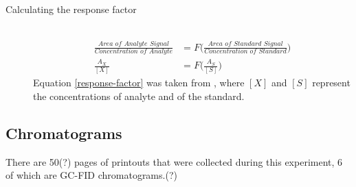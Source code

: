\documentclass[a4paper, 12pt]{article}
\begin{document}
\begin{description}
	\item[Calculating the response factor] \hfill \\
		\begin{equation} \label{response-factor}
		\begin{split}
			\frac{\textit{Area of Analyte Signal}}{\textit{Concentration of Analyte}} & = F\Bigg(\frac{\textit{Area of Standard Signal}}{\textit{Concentration of Standard}}\Bigg) \\
			\frac{A_X}{[X]} & = F\Bigg(\frac{A_S}{[S]}\Bigg)
		\end{split}
		\end{equation}
			Equation \ref{response-factor} was taken from \cite{harris}, where $[X]$ and $[S]$ represent the concentrations of analyte and of the standard.
\end{description}

\subsection{Chromatograms}
There are 50(?) pages of printouts that were collected during this experiment, 6 of which are GC-FID chromatograms.(?)


\end{document}

